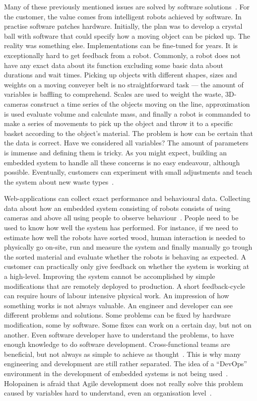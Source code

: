 \documentclass[english]{tktltiki2}
\begin{document}
Many of these previously mentioned issues are solved by software solutions~\cite{Hol15a}. For the customer, the value comes from intelligent robots achieved by software. In practise software patches hardware. Initially, the plan was to develop a crystal ball with software that could specify how a moving object can be picked up. The reality was something else. Implementations can be fine-tuned for years. It is exceptionally hard to get feedback from a robot. Commonly, a robot does not have any exact data about its function excluding some basic data about durations and wait times. Picking up objects with different shapes, sizes and weights on a moving conveyer belt is no straightforward task — the amount of variables is baffling to comprehend. Scales are used to weight the waste, 3D-cameras construct a time series of the objects moving on the line, approximation is used evaluate volume and calculate mass, and finally a robot is commanded to make a series of movements to pick up the object and throw it to a specific basket according to the object’s material. The problem is how can be certain that the data is correct. Have we considered all variables? The amount of parameters is immense and defining them is tricky. As you might expect, building an embedded system to handle all these concerns is no easy endeavour, although possible. Eventually, customers can experiment with small adjustments and teach the system about new waste types~\cite{Hol15a}.

Web-applications can collect exact performance and behavioural data. Collecting data about how an embedded system consisting of robots consists of using cameras and above all using people to observe behaviour~\cite{Hol15a}. People need to be used to know how well the system has performed. For instance, if we need to estimate how well the robots have sorted wood, human interaction is needed to physically go on-site, run and measure the system and finally manually go trough the sorted material and evaluate whether the robots is behaving as expected. A customer can practically only give feedback on whether the system is working at a high-level. Improving the system cannot be accomplished by simple modifications that are remotely deployed to production. A short feedback-cycle can require hours of labour intensive physical work. An impression of how something works is not always valuable. An engineer and developer can see different problems and solutions. Some problems can be fixed by hardware modification, some by software. Some fixes can work on a certain day, but not on another. Even software developer have to understand the problems, to have enough knowledge to do software development. Cross-functional teams are beneficial, but not always as simple to achieve as thought~\cite{BT15, Hol15a}. This is why many engineering and development are still rather separated. The idea of a “DevOps” environment in the development of embedded systems is not being used~\cite{BT15}. Holopainen is afraid that Agile development does not really solve this problem caused by variables hard to understand, even an organisation level~\cite{Hol15a}.
\end{document}
